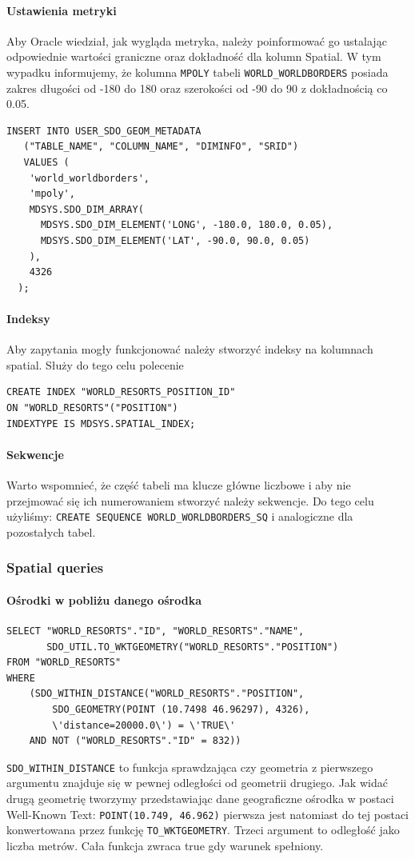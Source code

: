 \documentclass[12pt]{article}
\begin{document}
\paragraph{Ustawienia metryki}
Aby Oracle wiedział, jak wygląda metryka, należy poinformować go ustalając odpowiednie wartości graniczne
oraz dokładność dla kolumn Spatial. W tym wypadku informujemy, że kolumna \texttt{MPOLY} tabeli
\texttt{WORLD\_WORLDBORDERS} posiada zakres długości od -180 do 180 oraz szerokości od -90 do 90 z dokładnością
co 0.05.

\begin{verbatim}
INSERT INTO USER_SDO_GEOM_METADATA
   ("TABLE_NAME", "COLUMN_NAME", "DIMINFO", "SRID")
   VALUES (
    'world_worldborders',
    'mpoly',
    MDSYS.SDO_DIM_ARRAY(
      MDSYS.SDO_DIM_ELEMENT('LONG', -180.0, 180.0, 0.05),
      MDSYS.SDO_DIM_ELEMENT('LAT', -90.0, 90.0, 0.05)
    ),
    4326
  );
\end{verbatim}

\paragraph{Indeksy}
Aby zapytania mogły funkcjonować należy stworzyć indeksy na kolumnach spatial. Służy do tego celu polecenie
\begin{verbatim}
CREATE INDEX "WORLD_RESORTS_POSITION_ID"
ON "WORLD_RESORTS"("POSITION")
INDEXTYPE IS MDSYS.SPATIAL_INDEX;
\end{verbatim}

\paragraph{Sekwencje}
Warto wspomnieć, że część tabeli ma klucze główne liczbowe i aby nie przejmować się ich numerowaniem
stworzyć należy sekwencje. Do tego celu użyliśmy:
\texttt{CREATE SEQUENCE WORLD\_WORLDBORDERS\_SQ}
i analogiczne dla pozostałych tabel.

\subsubsection{Spatial queries}
\paragraph{Ośrodki w pobliżu danego ośrodka}
\begin{verbatim}
SELECT "WORLD_RESORTS"."ID", "WORLD_RESORTS"."NAME",
       SDO_UTIL.TO_WKTGEOMETRY("WORLD_RESORTS"."POSITION")
FROM "WORLD_RESORTS"
WHERE
    (SDO_WITHIN_DISTANCE("WORLD_RESORTS"."POSITION",
        SDO_GEOMETRY(POINT (10.7498 46.96297), 4326),
        \'distance=20000.0\') = \'TRUE\'
    AND NOT ("WORLD_RESORTS"."ID" = 832))
\end{verbatim}
\texttt{SDO\_WITHIN\_DISTANCE} to funkcja sprawdzająca czy geometria z pierwszego argumentu znajduje się w pewnej
odległości od geometrii drugiego. Jak widać drugą geometrię tworzymy przedstawiając dane geograficzne ośrodka
w postaci Well-Known Text: \texttt{POINT(10.749, 46.962)} pierwsza jest natomiast do tej postaci konwertowana
przez funkcję \texttt{TO\_WKTGEOMETRY}. Trzeci argument to odległość jako liczba metrów. Cała
funkcja zwraca true gdy warunek spełniony.
\end{document}
